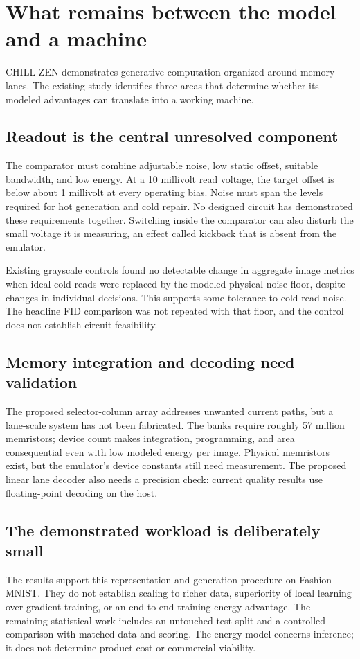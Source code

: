 \documentclass[11pt,letterpaper]{article}
\begin{document}
\newpage
\section{What remains between the model and a machine}
CHILL ZEN demonstrates generative computation organized around memory lanes. The existing study identifies three areas that determine whether its modeled advantages can translate into a working machine.

\subsection{Readout is the central unresolved component}
The comparator must combine adjustable noise, low static offset, suitable bandwidth, and low energy. At a 10 millivolt read voltage, the target offset is below about 1 millivolt at every operating bias. Noise must span the levels required for hot generation and cold repair. No designed circuit has demonstrated these requirements together. Switching inside the comparator can also disturb the small voltage it is measuring, an effect called kickback that is absent from the emulator.

Existing grayscale controls found no detectable change in aggregate image metrics when ideal cold reads were replaced by the modeled physical noise floor, despite changes in individual decisions. This supports some tolerance to cold-read noise. The headline FID comparison was not repeated with that floor, and the control does not establish circuit feasibility.

\subsection{Memory integration and decoding need validation}
The proposed selector-column array addresses unwanted current paths, but a lane-scale system has not been fabricated. The banks require roughly 57 million memristors; device count makes integration, programming, and area consequential even with low modeled energy per image. Physical memristors exist, but the emulator's device constants still need measurement. The proposed linear lane decoder also needs a precision check: current quality results use floating-point decoding on the host.

\subsection{The demonstrated workload is deliberately small}
The results support this representation and generation procedure on Fashion-MNIST. They do not establish scaling to richer data, superiority of local learning over gradient training, or an end-to-end training-energy advantage. The remaining statistical work includes an untouched test split and a controlled comparison with matched data and scoring. The energy model concerns inference; it does not determine product cost or commercial viability.
\end{document}
